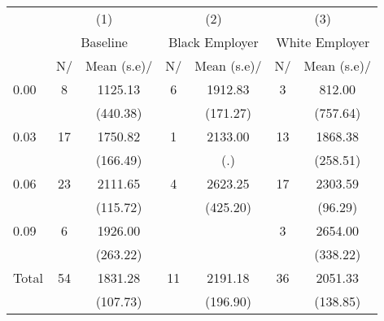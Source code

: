 \begin{tabular*}{\hsize}{@{\hskip\tabcolsep\extracolsep\fill}l*{3}{cc}} \hline\hline
                    &\multicolumn{2}{c}{(1)}  &\multicolumn{2}{c}{(2)}  &\multicolumn{2}{c}{(3)}  \\
                    &\multicolumn{2}{c}{Baseline}&\multicolumn{2}{c}{Black Employer}&\multicolumn{2}{c}{White Employer}\\
                    &N\?/\hspace{0.01cm}&Mean (s.e)\?/\hspace{0.01cm}&N\?/\hspace{0.01cm}&Mean (s.e)\?/\hspace{0.01cm}&N\?/\hspace{0.01cm}&Mean (s.e)\?/\hspace{0.01cm}\\
\hline
0.00                &           8&     1125.13&           6&     1912.83&           3&      812.00\\
                    &            &    (440.38)&            &    (171.27)&            &    (757.64)\\
[1em]
0.03                &          17&     1750.82&           1&     2133.00&          13&     1868.38\\
                    &            &    (166.49)&            &         (.)&            &    (258.51)\\
[1em]
0.06                &          23&     2111.65&           4&     2623.25&          17&     2303.59\\
                    &            &    (115.72)&            &    (425.20)&            &     (96.29)\\
[1em]
0.09                &           6&     1926.00&            &            &           3&     2654.00\\
                    &            &    (263.22)&            &            &            &    (338.22)\\
[1em]
Total               &          54&     1831.28&          11&     2191.18&          36&     2051.33\\
                    &            &    (107.73)&            &    (196.90)&            &    (138.85)\\
\hline\hline
\end{tabular*}
